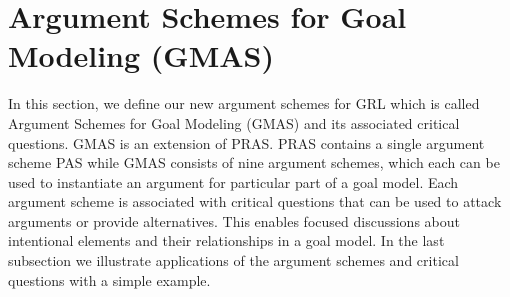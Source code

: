 \documentclass[11.5pt,two column]{llncs}
\begin{document}
\section{Argument Schemes for Goal Modeling (GMAS)}
\label{sect:gmas}



In this section, we define our new argument schemes for GRL which is called Argument Schemes for Goal Modeling (GMAS) and its associated critical questions. GMAS is an extension of PRAS. PRAS  contains a single argument scheme PAS while GMAS  consists of nine argument schemes, which each can be used to instantiate an argument for particular part of a goal model. Each argument scheme is associated with critical questions that can be used to attack arguments or provide alternatives. This enables focused discussions about intentional elements and their relationships in a goal model. In the last subsection we illustrate applications of the argument schemes and critical questions with a simple example.

\end{document}
